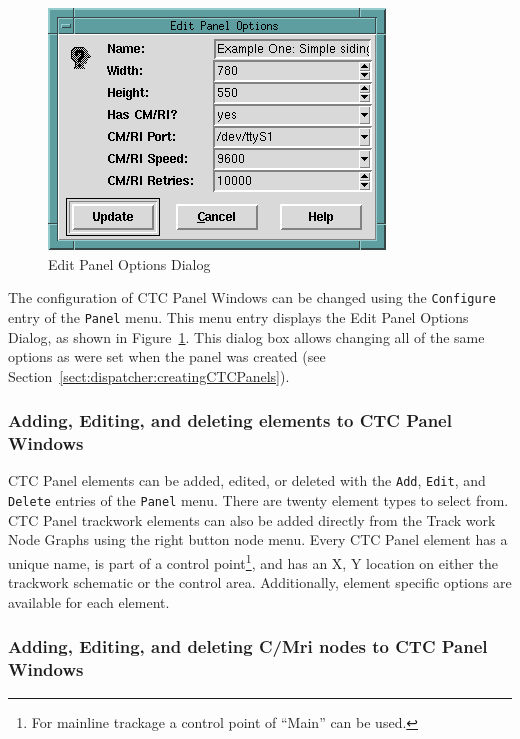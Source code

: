 \begin{figure}[hbpt]
\begin{centering}
\includegraphics{DISPEditPanelOptions.png}
\caption{Edit Panel Options Dialog}
\label{fig:dispatcher:editPanelOptsDialog}
\end{centering}
\end{figure}
The configuration of CTC Panel Windows can be changed using the
\verb=Configure= entry of the \verb=Panel= menu.  This menu entry
displays the Edit Panel Options Dialog, as shown in
Figure~\ref{fig:dispatcher:editPanelOptsDialog}. This dialog box allows
changing all of the same options as were set when the panel was created
(see Section~\ref{sect:dispatcher:creatingCTCPanels}).

\subsubsection{Adding, Editing, and deleting elements to CTC Panel Windows}

CTC Panel elements can be added, edited, or deleted with the
\verb=Add=, \verb=Edit=, and \verb=Delete= entries of the \verb=Panel=
menu. There are twenty element types to select from.  CTC Panel
trackwork elements can also be added directly from the Track work Node
Graphs using the right button node menu.  Every CTC Panel element has a
unique name, is part of a control point\footnote{For mainline trackage a
control point of ``Main'' can be used.}, and has an X, Y location on
either the trackwork schematic or the control area. Additionally,
element specific options are available for each element.

\subsubsection{Adding, Editing, and deleting C/Mri nodes to CTC Panel
Windows}

